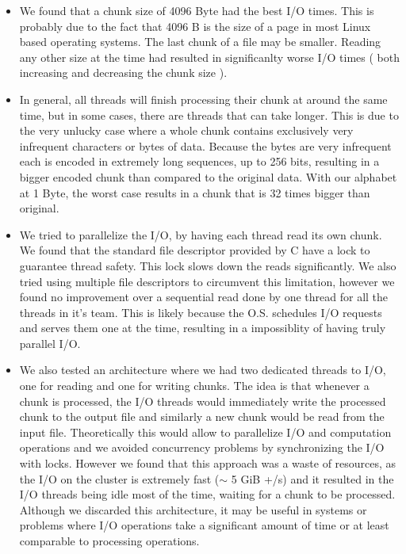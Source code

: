 \begin{itemize}

\item We found that a chunk size of 4096 Byte had the best I/O times. This is probably due to the fact that 4096 B is the size of a page in most Linux based operating systems. The last chunk of a file may be smaller. Reading any other size at the time had resulted in significanlty worse I/O times ( both increasing and decreasing the chunk size ).

\item In general, all threads will finish processing their chunk at around the same time, but in some cases, there are threads that can take longer. This is due to the very unlucky case where a whole chunk contains exclusively very infrequent characters or bytes of data. Because the bytes are very infrequent each is encoded in extremely long sequences, up to 256 bits, resulting in a bigger encoded chunk than compared to the original data. With our alphabet at 1 Byte, the worst case results in a chunk that is 32 times bigger than original.

\item We tried to parallelize the I/O, by having each thread read its own chunk. We found that the standard file descriptor provided by C have a lock to guarantee thread safety.  This lock slows down the reads significantly. We also tried using multiple file descriptors to circumvent this limitation, however we found no improvement over a sequential read done by one thread for all the threads in it's team. This is likely because the O.S. schedules I/O requests and serves them one at the time, resulting in a impossiblity of having truly parallel I/O.

\item We also tested an architecture where we had two dedicated threads to I/O, one for reading and one for writing chunks. The idea is that whenever a chunk is processed, the I/O threads would immediately write the processed chunk to the output file and similarly a new chunk would be read from the input file. Theoretically this would allow to parallelize I/O and computation operations and we avoided concurrency problems by synchronizing the I/O with locks. However we found that this approach was a waste  of resources, as the I/O on the cluster is extremely fast ($\sim$ 5 GiB +/s) and it resulted in the I/O threads being idle most of the time, waiting for a chunk to be processed. Although we discarded this architecture, it may be useful in systems or problems where I/O operations take a significant amount of time or at least comparable to processing operations. 

\end{itemize}
